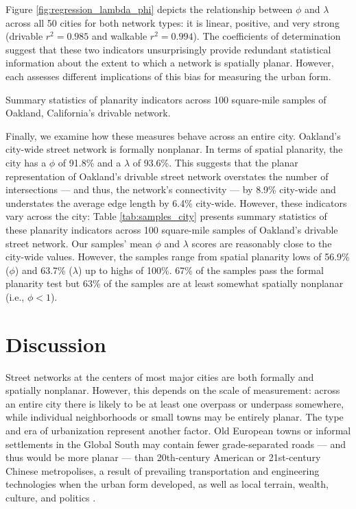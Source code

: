\documentclass[Afour,sageh,times]{sagej}
\begin{document}
Figure \ref{fig:regression_lambda_phi} depicts the relationship between $\phi$ and $\lambda$ across all 50 cities for both network types: it is linear, positive, and very strong (drivable $r^2=0.985$ and walkable $r^2=0.994$). The coefficients of determination suggest that these two indicators unsurprisingly provide redundant statistical information about the extent to which a network is spatially planar. However, each assesses different implications of this bias for measuring the urban form.

\begin{table}[htbp]
	\centering
	\caption{Summary statistics of planarity indicators across 100 square-mile samples of Oakland, California's drivable network.}
	\label{tab:samples_city}
	
\end{table}

Finally, we examine how these measures behave across an entire city. Oakland's city-wide street network is formally nonplanar. In terms of spatial planarity, the city has a $\phi$ of 91.8\% and a $\lambda$ of 93.6\%. This suggests that the planar representation of Oakland's drivable street network overstates the number of intersections --- and thus, the network's connectivity --- by 8.9\% city-wide and understates the average edge length by 6.4\% city-wide. However, these indicators vary across the city: Table \ref{tab:samples_city} presents summary statistics of these planarity indicators across 100 square-mile samples of Oakland's drivable street network. Our samples' mean $\phi$ and $\lambda$ scores are reasonably close to the city-wide values. However, the samples range from spatial planarity lows of 56.9\% ($\phi$) and 63.7\% ($\lambda$) up to highs of 100\%. 67\% of the samples pass the formal planarity test but 63\% of the samples are at least somewhat spatially nonplanar (i.e., $\phi < 1$).



\section{Discussion}

Street networks at the centers of most major cities are both formally and spatially nonplanar. However, this depends on the scale of measurement: across an entire city there is likely to be at least one overpass or underpass somewhere, while individual neighborhoods or small towns may be entirely planar. The type and era of urbanization represent another factor. Old European towns or informal settlements in the Global South may contain fewer grade-separated roads --- and thus would be more planar --- than 20th-century American or 21st-century Chinese metropolises, a result of prevailing transportation and engineering technologies when the urban form developed, as well as local terrain, wealth, culture, and politics \citep{southworth_street_1995}.
\end{document}
